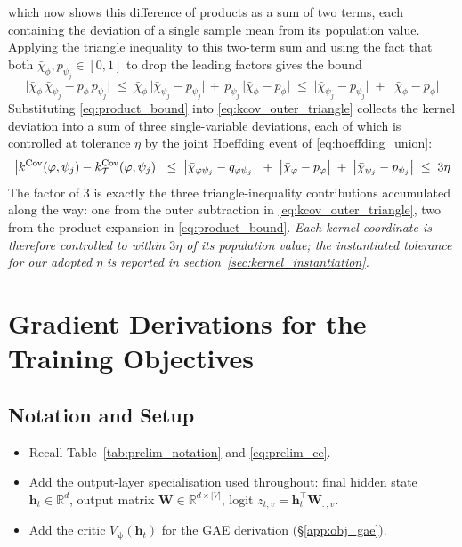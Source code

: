 \documentclass[titlepage,a4paper,11pt]{report}
\begin{document}
    which now shows this difference of products as a sum of two terms, each containing the deviation of a single sample mean from its population value. Applying the triangle inequality to this two-term sum and using the fact that both $\bar\chi_\phi, p_{\psi_j} \in [0, 1]$ to drop the leading factors gives the bound
    \begin{equation}\label{eq:product_bound}
        \bigl|\bar\chi_\phi\, \bar\chi_{\psi_j} - p_\phi\, p_{\psi_j}\bigr| \;\le\; \bar\chi_\phi\,\bigl|\bar\chi_{\psi_j} - p_{\psi_j}\bigr| \, + \, p_{\psi_j}\,\bigl|\bar\chi_\phi - p_\phi\bigr| \;\le\; \bigl|\bar\chi_{\psi_j} - p_{\psi_j}\bigr| \;+\; \bigl|\bar\chi_\phi - p_\phi\bigr|
    \end{equation}
    Substituting \eqref{eq:product_bound} into \eqref{eq:kcov_outer_triangle} collects the kernel deviation into a sum of three single-variable deviations, each of which is controlled at tolerance $\eta$ by the joint Hoeffding event of \eqref{eq:hoeffding_union}:
    \begin{equation}\label{eq:kcov_propagation}
        \bigl| k^{\mathrm{Cov}}(\varphi, \psi_j) - k^{\mathrm{Cov}}_\mathcal{T}(\varphi, \psi_j) \bigr| \;\le\; \bigl|\bar\chi_{\varphi\psi_j} - q_{\varphi\psi_j}\bigr| \;+\; \bigl|\bar\chi_\varphi - p_\varphi\bigr| \;+\; \bigl|\bar\chi_{\psi_j} - p_{\psi_j}\bigr| \;\le\; 3\eta
    \end{equation}
    The factor of $3$ is exactly the three triangle-inequality contributions accumulated along the way: one from the outer subtraction in \eqref{eq:kcov_outer_triangle}, two from the product expansion in \eqref{eq:product_bound}. \emph{Each kernel coordinate is therefore controlled to within $3\eta$ of its population value; the instantiated tolerance for our adopted $\eta$ is reported in section~\ref{sec:kernel_instantiation}.}


\section{Gradient Derivations for the Training Objectives}\label{app:objective_gradients}

    \subsection{Notation and Setup}\label{app:obj_setup}
    \begin{itemize}
        \item Recall Table~\ref{tab:prelim_notation} and \eqref{eq:prelim_ce}.
        \item Add the output-layer specialisation used throughout: final hidden state
              $\bm h_t \in \mathbb{R}^d$, output matrix $\bm W \in \mathbb{R}^{d\times|V|}$,
              logit $z_{t,v} = \bm h_t^\top \bm W_{:,v}$.
        \item Add the critic $V_{\bm\psi}(\bm h_t)$ for the GAE derivation (§\ref{app:obj_gae}).
    \end{itemize}
\end{document}
